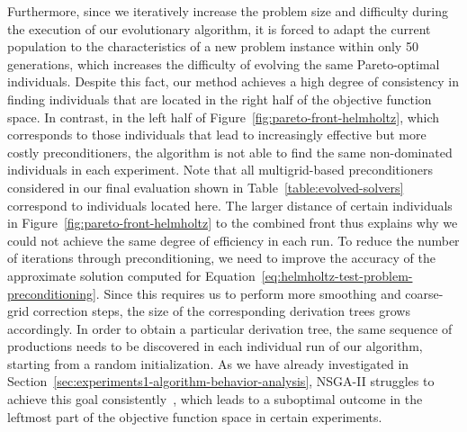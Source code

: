 Furthermore, since we iteratively increase the problem size and difficulty during the execution of our evolutionary algorithm, it is forced to adapt the current population to the characteristics of a new problem instance within only 50 generations, which increases the difficulty of evolving the same Pareto-optimal individuals.
Despite this fact, our method achieves a high degree of consistency in finding individuals that are located in the right half of the objective function space.
In contrast, in the left half of Figure~\ref{fig:pareto-front-helmholtz}, which corresponds to those individuals that lead to increasingly effective but more costly preconditioners, the algorithm is not able to find the same non-dominated individuals in each experiment.
Note that all multigrid-based preconditioners considered in our final evaluation shown in Table~\ref{table:evolved-solvers} correspond to individuals located here.
The larger distance of certain individuals in Figure~\ref{fig:pareto-front-helmholtz} to the combined front thus explains why we could not achieve the same degree of efficiency in each run.
To reduce the number of iterations through preconditioning, we need to improve the accuracy of the approximate solution computed for Equation~\eqref{eq:helmholtz-test-problem-preconditioning}.
Since this requires us to perform more smoothing and coarse-grid correction steps, the size of the corresponding derivation trees grows accordingly.
In order to obtain a particular derivation tree, the same sequence of productions needs to be discovered in each individual run of our algorithm, starting from a random initialization.
As we have already investigated in Section~\ref{sec:experiments1-algorithm-behavior-analysis}, NSGA-II struggles to achieve this goal consistently~\cite{liu2022evolvability}, which leads to a suboptimal outcome in the leftmost part of the objective function space in certain experiments.
